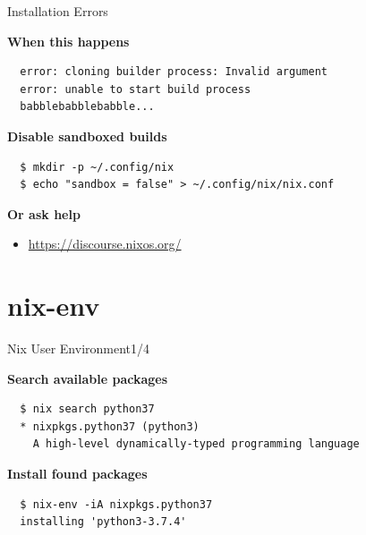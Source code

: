 \documentclass[12pt,aspectratio=169]{beamer}
\begin{document}

\begin{frame}[fragile]{Installation Errors}

  \textbf{When this happens}

  \begin{verbatim}
  error: cloning builder process: Invalid argument
  error: unable to start build process
  babblebabblebabble...
  \end{verbatim}

  \textbf{Disable sandboxed builds}

  \begin{verbatim}
  $ mkdir -p ~/.config/nix
  $ echo "sandbox = false" > ~/.config/nix/nix.conf
  \end{verbatim}

  \textbf{Or ask help}

  \begin{itemize}
    \item \href{https://discourse.nixos.org/}{https://discourse.nixos.org/}
  \end{itemize}

\end{frame}


\section{nix-env}


\begin{frame}[fragile]{Nix User Environment\hfill1/4}

  \textbf{Search available packages}
  \begin{verbatim}
  $ nix search python37
  * nixpkgs.python37 (python3)
    A high-level dynamically-typed programming language
  \end{verbatim}

  \textbf{Install found packages}
  \begin{verbatim}
  $ nix-env -iA nixpkgs.python37
  installing 'python3-3.7.4'
  \end{verbatim}

\end{frame}
\end{document}
